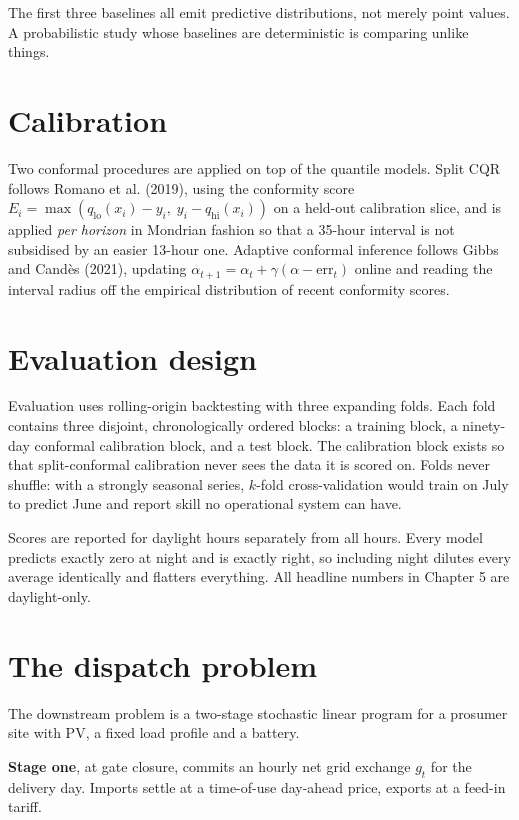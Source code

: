 \documentclass[11pt,a4paper,oneside]{report}
\begin{document}
The first three baselines all emit predictive distributions, not merely point values. A probabilistic study whose baselines are deterministic is comparing unlike things.

\section{Calibration}

Two conformal procedures are applied on top of the quantile models. Split CQR follows Romano et al. (2019), using the conformity score $E_i = \max(q_{\mathrm{lo}}(x_i) - y_i,\; y_i - q_{\mathrm{hi}}(x_i))$ on a held-out calibration slice, and is applied \emph{per horizon} in Mondrian fashion so that a 35-hour interval is not subsidised by an easier 13-hour one. Adaptive conformal inference follows Gibbs and Candès (2021), updating $\alpha_{t+1} = \alpha_t + \gamma(\alpha - \mathrm{err}_t)$ online and reading the interval radius off the empirical distribution of recent conformity scores.

\section{Evaluation design}

Evaluation uses rolling-origin backtesting with three expanding folds. Each fold contains three disjoint, chronologically ordered blocks: a training block, a ninety-day conformal calibration block, and a test block. The calibration block exists so that split-conformal calibration never sees the data it is scored on. Folds never shuffle: with a strongly seasonal series, $k$-fold cross-validation would train on July to predict June and report skill no operational system can have.

Scores are reported for daylight hours separately from all hours. Every model predicts exactly zero at night and is exactly right, so including night dilutes every average identically and flatters everything. All headline numbers in Chapter 5 are daylight-only.

\section{The dispatch problem}

The downstream problem is a two-stage stochastic linear program for a prosumer site with PV, a fixed load profile and a battery.

\textbf{Stage one}, at gate closure, commits an hourly net grid exchange $g_t$ for the delivery day. Imports settle at a time-of-use day-ahead price, exports at a feed-in tariff.
\end{document}
